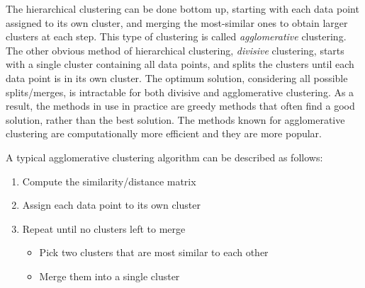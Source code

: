 The hierarchical clustering can be done bottom up,
starting with each data point assigned to its own cluster,
and merging the most-similar ones to obtain larger clusters at each step. 
This type of clustering is called \emph{agglomerative} clustering.
The other obvious method of hierarchical clustering,
\emph{divisive} clustering,
starts with a single cluster containing all data points,
and splits the clusters until each data point is in its own cluster.
The optimum solution, considering all possible splits/merges,
is intractable for both divisive and agglomerative clustering.
As a result, the methods in use in practice are greedy methods
that often find a good solution, rather than the best solution.
The methods known for agglomerative clustering are
computationally more efficient and they are more popular.

A typical agglomerative clustering algorithm can be
described as follows:

\begin{enumerate}
  \item Compute the similarity/distance matrix
  \item Assign each data point to its own cluster
  \item Repeat until no clusters left to merge
    \begin{itemize}
      \item Pick two clusters that are most similar to each other
      \item Merge them into a single cluster
    \end{itemize}
\end{enumerate}



